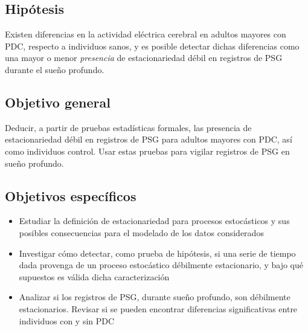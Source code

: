 \subsection{Hipótesis}

Existen diferencias en la actividad eléctrica cerebral en adultos mayores con PDC, respecto
a individuos sanos, y es posible detectar dichas diferencias como una mayor o menor \textit{presencia} 
de estacionariedad débil en registros de PSG durante el sueño profundo.


\subsection{Objetivo general}

Deducir, a partir de pruebas estadísticas formales, las presencia de estacionariedad débil en
registros de PSG para adultos mayores con PDC, así como individuos control.
Usar estas pruebas para vigilar registros de PSG en sueño profundo.


\subsection{Objetivos específicos}

\begin{itemize}
\item Estudiar la definición de estacionariedad para procesos estocásticos y sus posibles 
consecuencias para el modelado de los datos considerados

\item Investigar cómo detectar, como prueba de hipótesis, si una serie de tiempo dada provenga
de un proceso estocástico débilmente estacionario, y bajo qué supuestos 
es válida dicha caracterización

\item Analizar si los registros de PSG, durante sueño profundo, son débilmente estacionarios.
Revisar si se pueden encontrar diferencias significativas entre individuos con y sin PDC
\end{itemize}

